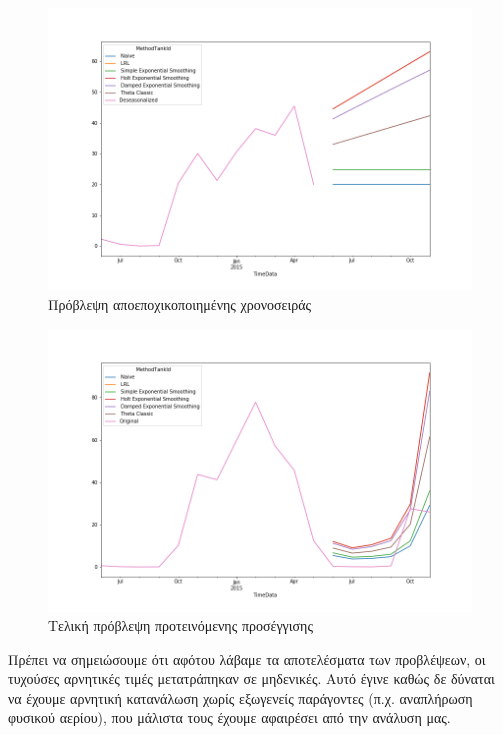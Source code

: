 \begin{figure}[t!]
  \includegraphics[scale=0.5]{figures/deseasonalized.png}
\centering
\caption{Πρόβλεψη αποεποχικοποιημένης χρονοσειράς}
\label{deseasonalizedforecast}
\end{figure} 


\begin{figure}[t!]
  \includegraphics[scale=0.5]{figures/newforecasting.png}
\centering
\caption{Τελική πρόβλεψη προτεινόμενης προσέγγισης}
\label{newforecasting}
\end{figure} 

Πρέπει να σημειώσουμε ότι αφότου λάβαμε τα αποτελέσματα των προβλέψεων, οι τυχούσες αρνητικές τιμές μετατράπηκαν σε μηδενικές. Αυτό έγινε καθώς δε δύναται να έχουμε αρνητική κατανάλωση χωρίς εξωγενείς παράγοντες (π.χ. αναπλήρωση φυσικού αερίου), που μάλιστα τους έχουμε αφαιρέσει από την ανάλυση μας.

